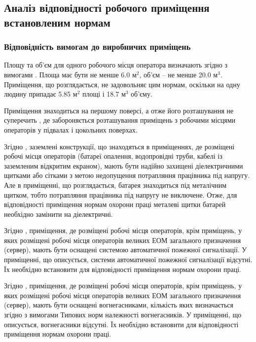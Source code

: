 \documentclass[a4paper,12pt]{article}
\begin{document}
\subsection{Аналіз відповідності робочого приміщення встановленим нормам}
\subsubsection{Відповідність вимогам до виробничих приміщень}
Площу  та  об'єм  для  одного  робочого місця оператора визначають згідно з вимогами \cite{sanpin798}. Площа має бути не менше 6.0 $\text{м}^2$, об'єм -- не менше 20.0 $\text{м}^3$. Приміщення, що розглядається, не задовольняє цим нормам, оскільки на одну людину припадає 5.85 $\text{м}^2$ площі і 18.7 $\text{м}^3$ об’єму.

Приміщення знаходиться на першому поверсі, а отже його розташування не суперечить \cite{npaop1210}, де забороняється розташування приміщень з робочими місцями  операторів у підвалах і цокольних поверхах.

Згідно \cite{npaop1210}, заземлені конструкції, що знаходяться в приміщеннях, де розміщені робочі місця операторів (батареї опалення,  водопровідні труби, кабелі із заземленим відкритим екраном), мають бути надійно захищені діелектричними щитками або сітками  з  метою  недопущення потрапляння працівника під напругу. Але в приміщенні, що розглядається, батарея знаходиться під металічним щитком, тобто потрапляння працівника під напругу не виключене. Отже, для відповідності приміщення нормам охорони праці металеві щитки батарей необхідно замінити на діелектричні.

Згідно \cite{npaop1210}, приміщення, де розміщені робочі місця операторів, крім приміщень, у яких розміщені робочі місця операторів великих ЕОМ загального призначення (сервер), мають бути оснащені системою автоматичної пожежної сигналізації. У приміщенні, що описується, системи автоматичної пожежної сигналізації відсутні. Їх необхідно встановити для відповідності приміщення нормам охорони праці.

Згідно \cite{npaop1210}, приміщення, де розміщені робочі місця операторів, крім приміщень, у яких розміщені робочі місця операторів великих ЕОМ загального призначення (сервер), мають бути оснащені вогнегасниками, кількість яких визначається згідно з вимогами Типових норм належності вогнегасників. У приміщенні, що описується, вогнегасники відсутні. Їх необхідно встановити для відповідності приміщення нормам охорони праці.
\end{document}

